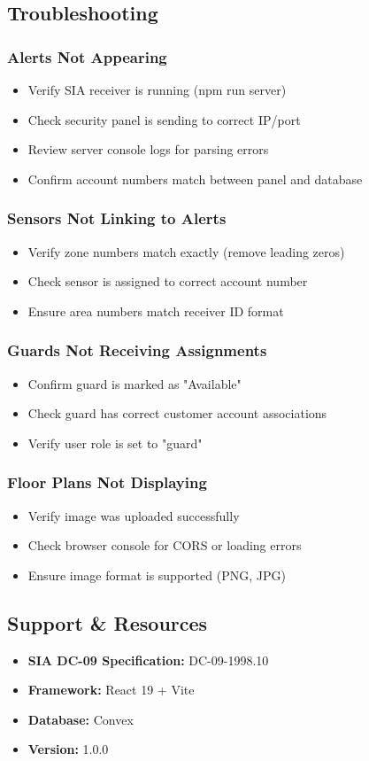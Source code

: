 \documentclass[12pt,a4paper]{article}
\begin{document}
\subsection{Troubleshooting}

\subsubsection{Alerts Not Appearing}
\begin{itemize}
\item Verify SIA receiver is running (npm run server)
\item Check security panel is sending to correct IP/port
\item Review server console logs for parsing errors
\item Confirm account numbers match between panel and database
\end{itemize}

\subsubsection{Sensors Not Linking to Alerts}
\begin{itemize}
\item Verify zone numbers match exactly (remove leading zeros)
\item Check sensor is assigned to correct account number
\item Ensure area numbers match receiver ID format
\end{itemize}

\subsubsection{Guards Not Receiving Assignments}
\begin{itemize}
\item Confirm guard is marked as "Available"
\item Check guard has correct customer account associations
\item Verify user role is set to "guard"
\end{itemize}

\subsubsection{Floor Plans Not Displaying}
\begin{itemize}
\item Verify image was uploaded successfully
\item Check browser console for CORS or loading errors
\item Ensure image format is supported (PNG, JPG)
\end{itemize}

\subsection{Support \& Resources}

\begin{itemize}
\item \textbf{SIA DC-09 Specification:} DC-09-1998.10
\item \textbf{Framework:} React 19 + Vite
\item \textbf{Database:} Convex
\item \textbf{Version:} 1.0.0
\end{itemize}
\end{document}
